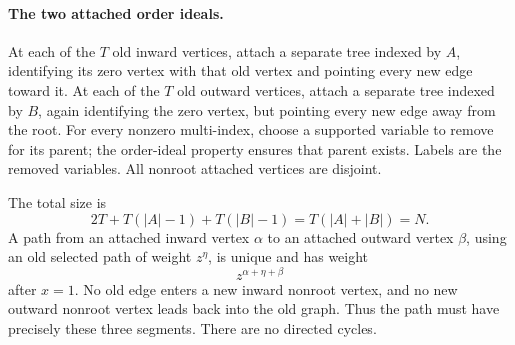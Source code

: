 \paragraph{The two attached order ideals.}
At each of the \(T\) old inward vertices, attach a separate
tree indexed by \(A\), identifying its zero vertex with
that old vertex and pointing every new edge toward it.
At each of the \(T\) old outward vertices, attach a separate
tree indexed by \(B\), again identifying the zero vertex,
but pointing every new edge away from the root.
For every nonzero multi-index, choose a supported variable
to remove for its parent; the order-ideal property ensures
that parent exists. Labels are the removed variables.
All nonroot attached vertices are disjoint.

The total size is
\[
        2T+T(|A|-1)+T(|B|-1)=T(|A|+|B|)=N.
\]
A path from an attached inward vertex \(\alpha\) to an
attached outward vertex \(\beta\), using an old selected
path of weight \(z^\eta\), is unique and has weight
\[
                              z^{\alpha+\eta+\beta}
                                                               \tag{M-019.3}
\]
after \(x=1\). No old edge enters a new inward nonroot
vertex, and no new outward nonroot vertex leads back into
the old graph. Thus the path must have precisely these
three segments. There are no directed cycles.

